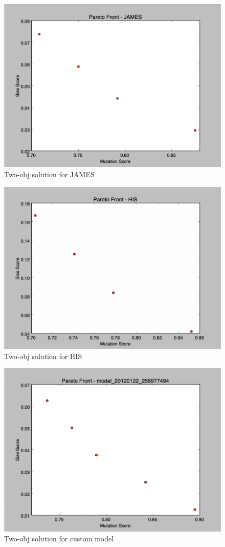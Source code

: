\documentclass[a4paper,12pt]{article}
\begin{document}
\begin{figure}[h!]
\centering
\includegraphics[width=.7\linewidth]{Images/JAMES.png}
\caption{Two-obj solution for JAMES}
\label{fig:computerNo}
\end{figure}
\begin{figure}[h!]
\centering
\includegraphics[width=.7\linewidth]{Images/HIS.png}
\caption{Two-obj solution for HIS}
\label{fig:computerNo}
\end{figure}
\begin{figure}[h!]
\centering
\includegraphics[width=.7\linewidth]{Images/model.png}
\caption{Two-obj solution for custom model}
\label{fig:computerNo}
\end{figure}
\end{document}
